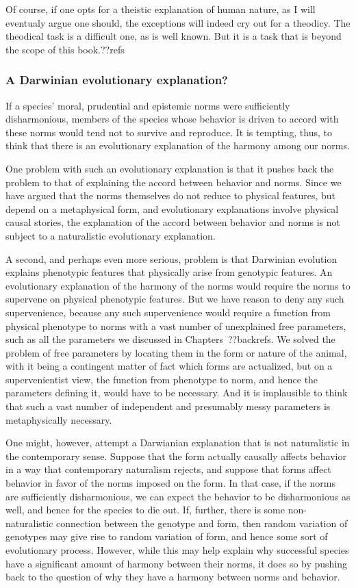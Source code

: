 Of course, if one opts for a theistic explanation of human nature, as I will eventualy argue one should, the exceptions 
will indeed cry out for a theodicy. The theodical task is a difficult one, as is well known. But it is a task that is 
beyond the scope of this book.??refs

\subsubsection{A Darwinian evolutionary explanation?}
If a species' moral, prudential and epistemic norms were sufficiently disharmonious, members of the species whose 
behavior is driven to accord with these norms would tend not to survive and reproduce. It is tempting, thus, to think
that there is an evolutionary explanation of the harmony among our norms. 

One problem with such an evolutionary explanation is that it pushes back the problem to that of explaining the accord
between behavior and norms. Since we have argued that the norms themselves do not reduce to physical features, but 
depend on a metaphysical form, and evolutionary explanations involve physical causal stories, the explanation of the 
accord between behavior and norms is not subject to a naturalistic evolutionary explanation. 

A second, and perhaps even more serious, problem is that Darwinian evolution explains phenotypic features that physically arise 
from genotypic features. An evolutionary explanation of the harmony of the norms would require the norms to supervene on 
physical phenotypic features. But we have reason to deny any such supervenience, because any such supervenience would require
a function from physical phenotype to norms with a vast number of unexplained free parameters, such as all the parameters we
discussed in Chapters~??backrefs. We solved the problem of free parameters by locating them in the form or nature of the 
animal, with it being a contingent matter of fact which forms are actualized, but on a supervenientist view, the function 
from phenotype to norm, and hence the parameters defining it, would have to be necessary. And it is implausible to think 
that such a vast number of independent and presumably messy parameters is metaphysically necessary.

One might, however, attempt a Darwianian explanation that is not naturalistic in the contemporary sense. Suppose that 
the form actually causally affects behavior in a way that contemporary naturalism rejects, and suppose that forms
affect behavior in favor of the norms imposed on the form. In that case, if the norms are sufficiently disharmonious,
we can expect the behavior to be disharmonious as well, and hence for the species to die out. If, further, there is
some non-naturalistic connection between the genotype and form, then random variation of genotypes may give rise to
random variation of form, and hence some sort of evolutionary process. However, while this may help explain why 
successful species have a significant amount of harmony between their norms, it does so by pushing back to the
question of why they have a harmony between norms and behavior. 

